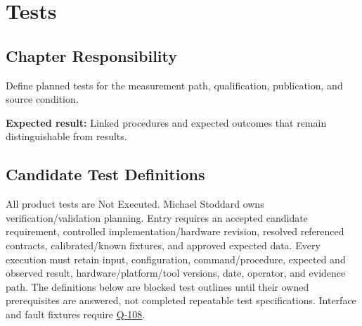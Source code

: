 \chapter{Tests}
\section{Chapter Responsibility}
\label{Section:TestsResponsibility}
Define planned tests for the measurement path, qualification, publication, and source condition.

\noindent\textbf{Expected result:} Linked procedures and expected outcomes that remain distinguishable from results.

\section{Candidate Test Definitions}
All product tests are Not Executed. Michael Stoddard owns verification/validation planning. Entry requires an accepted candidate requirement, controlled implementation/hardware revision, resolved referenced contracts, calibrated/known fixtures, and approved expected data. Every execution must retain input, configuration, command/procedure, expected and observed result, hardware/platform/tool versions, date, operator, and evidence path. The definitions below are blocked test outlines until their owned prerequisites are answered, not completed repeatable test specifications. Interface and fault fixtures require \hyperref[Question:Q-108]{Q-108}.

